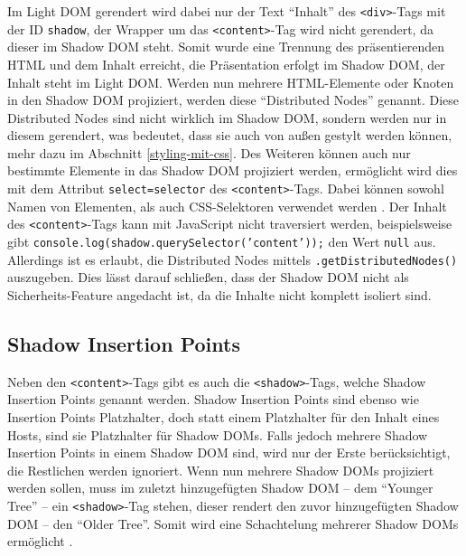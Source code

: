 Im Light \ac{DOM} gerendert wird dabei nur der Text ``Inhalt'' des \texttt{\textless{}div\textgreater{}}-Tags mit der ID \texttt{shadow}, der Wrapper um das \texttt{\textless{}content\textgreater{}}-Tag wird nicht gerendert, da dieser im Shadow \ac{DOM} steht. Somit wurde eine Trennung des präsentierenden \ac{HTML} und dem Inhalt erreicht, die Präsentation erfolgt im Shadow \ac{DOM}, der Inhalt steht im Light \ac{DOM}. Werden nun mehrere \ac{HTML}-Elemente oder Knoten in den Shadow \ac{DOM} projiziert, werden diese ``Distributed Nodes'' genannt. Diese Distributed Nodes sind nicht wirklich im Shadow \ac{DOM}, sondern werden nur in diesem gerendert, was bedeutet, dass sie auch von außen gestylt werden können, mehr dazu im Abschnitt \ref{styling-mit-css}. Des Weiteren können auch nur bestimmte Elemente in das Shadow \ac{DOM} projiziert werden, ermöglicht wird dies mit dem Attribut \texttt{select=\dq selector\dq} des \texttt{\textless{}content\textgreater{}}-Tags. Dabei können sowohl Namen von Elementen, als auch \ac{CSS}-Selektoren verwendet werden \cite{citeulike:13851402}. Der Inhalt des \texttt{\textless{}content\textgreater{}}-Tags kann mit JavaScript nicht traversiert werden, beispielsweise gibt \texttt{console.log(shadow.querySelector('content'));} den Wert \texttt{null} aus. Allerdings ist es erlaubt, die Distributed Nodes mittels \texttt{.getDistributedNodes()} auszugeben. Dies lässt darauf schließen, dass der Shadow \ac{DOM} nicht als Sicherheits-Feature angedacht ist, da die Inhalte nicht komplett isoliert sind.

\subsection{Shadow Insertion Points}\label{shadow-insertion-points}

Neben den \texttt{\textless{}content\textgreater{}}-Tags gibt es auch die \texttt{\textless{}shadow\textgreater{}}-Tags, welche Shadow Insertion Points genannt werden. Shadow Insertion Points sind ebenso wie Insertion Points Platzhalter, doch statt einem Platzhalter für den Inhalt eines Hosts, sind sie Platzhalter für Shadow \ac{DOM}s. Falls jedoch mehrere Shadow Insertion Points in einem Shadow \ac{DOM} sind, wird nur der Erste berücksichtigt, die Restlichen werden ignoriert. Wenn nun mehrere Shadow \ac{DOM}s projiziert werden sollen, muss im zuletzt hinzugefügten Shadow \ac{DOM} -- dem ``Younger Tree'' -- ein \texttt{\textless{}shadow\textgreater{}}-Tag stehen, dieser rendert den zuvor hinzugefügten Shadow \ac{DOM} -- den ``Older Tree''. Somit wird eine Schachtelung mehrerer Shadow \ac{DOM}s ermöglicht \cite{citeulike:13851421}.

